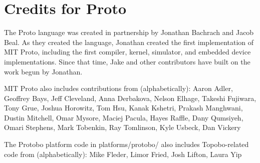 
\section{Credits for Proto}

The Proto language was created in partnership by Jonathan Bachrach and
Jacob Beal.  As they created the language, Jonathan created the first
implementation of MIT Proto, including the first compiler, kernel,
simulator, and embedded device implementations.  Since that time, Jake
and other contributors have built on the work begun by Jonathan.

MIT Proto also includes contributions from (alphabetically):
%
Aaron Adler, Geoffrey Bays, Jeff Cleveland, Anna Derbakova, Nelson
Elhage, Takeshi Fujiwara, Tony Grue, Joshua Horowitz, Tom Hsu, Kanak
Kshetri, Prakash Manghwani, Dustin Mitchell, Omar Mysore, Maciej
Pacula, Hayes Raffle, Dany Qumsiyeh, Omari Stephens, Mark Tobenkin,
Ray Tomlinson, Kyle Usbeck, Dan Vickery

The Protobo platform code in platforms/protobo/ also includes 
Topobo-related code from (alphabetically):
%
  Mike Fleder, Limor Fried, Josh Lifton, Laura Yip
